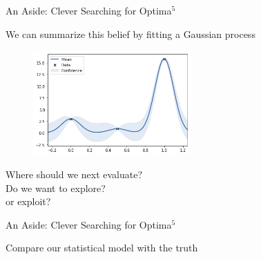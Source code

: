 \documentclass{beamer}
\begin{document}
\begin{frame}{An Aside: Clever Searching for Optima$^5$}
	\begin{block}{}
	We can summarize this belief by fitting a Gaussian process

	\begin{figure}[h]
		\begin{center}
			\includegraphics[height=4cm]{GP}
		\end{center}
	\end{figure}
	Where should we next evaluate?\\
	Do we want to explore?\\
	or exploit?\\
\end{block}
\end{frame}

\begin{frame}{An Aside: Clever Searching for Optima$^5$}
	\begin{block}{}
		Compare our statistical model with the truth
		
	\begin{figure}[h]
	\begin{center}
	\end{center}
\end{figure}
	\end{block}
\end{frame}
\end{document}
